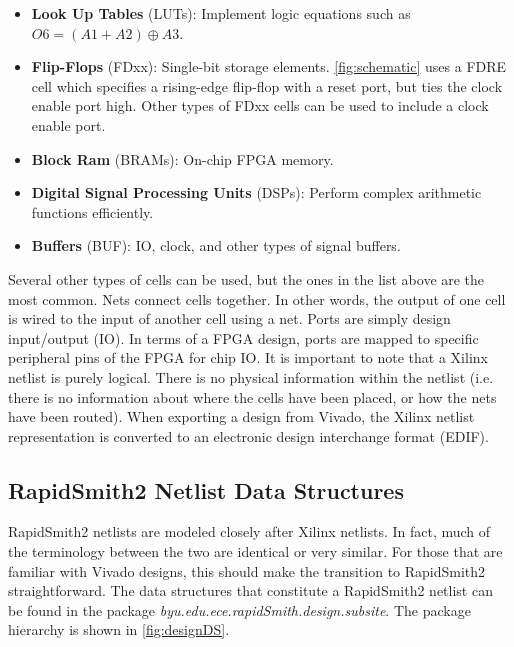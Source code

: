 \begin{itemize}
  \item \textbf{Look Up Tables} (LUTs): Implement logic equations such as
  $O6 = (A1 + A2) \oplus A3$.
  \item \textbf{Flip-Flops} (FDxx): Single-bit storage elements.
  \autoref{fig:schematic} uses a FDRE cell which specifies a rising-edge
  flip-flop with a reset port, but ties the clock enable port high. Other
  types of FDxx cells can be used to include a clock enable port.
  \item \textbf{Block Ram} (BRAMs): On-chip FPGA memory.
  \item \textbf{Digital Signal Processing Units} (DSPs): Perform complex arithmetic
  functions efficiently.
  \item \textbf{Buffers} (BUF): IO, clock, and other types of signal buffers. 
\end{itemize}

\noindent
Several other types of cells can be used, but the ones in the list above
are the most common. Nets connect cells together. In
other words, the output of one cell is wired to the input of another
cell using a net. Ports are simply design input/output (IO). In terms of a FPGA
design, ports are mapped to specific peripheral pins of the FPGA
for chip IO. It is important to note that a Xilinx netlist is purely logical.
There is no physical information within the netlist (i.e. there is no information about
where the cells have been placed, or how the nets have been routed). When
exporting a design from Vivado, the Xilinx netlist representation is converted
to an electronic design interchange format (EDIF).

\subsection {RapidSmith2 Netlist Data Structures} \label{sec:designDS}
RapidSmith2 netlists are modeled closely after Xilinx netlists. In fact,
much of the terminology between the two are identical or very similar. For those
that are familiar with Vivado designs, this should make the transition to
RapidSmith2 straightforward. The data structures that constitute a RapidSmith2
netlist can be found in the package
\textit{byu.edu.ece.rapidSmith.design.subsite}.
The package hierarchy is shown in \autoref{fig:designDS}.

